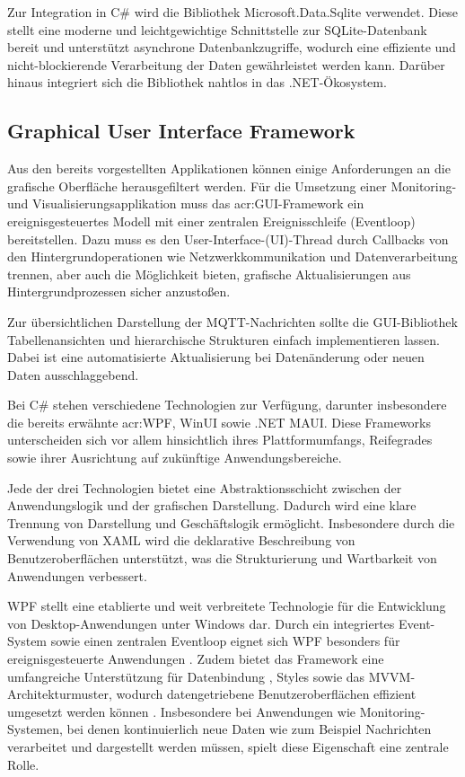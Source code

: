        Zur Integration in C\# wird die Bibliothek Microsoft.Data.Sqlite verwendet. 
        Diese stellt eine moderne und leichtgewichtige Schnittstelle zur SQLite-Datenbank 
        bereit und unterstützt asynchrone Datenbankzugriffe, wodurch eine effiziente 
        und nicht-blockierende Verarbeitung der Daten gewährleistet werden kann. Darüber hinaus integriert sich die Bibliothek nahtlos in das .NET-Ökosystem. \autocite{ajcvickersOverviewMicrosoftDataSqlite}
        
    \subsection{Graphical User Interface Framework}
        Aus den bereits vorgestellten Applikationen können einige Anforderungen an die grafische Oberfläche herausgefiltert werden. Für die Umsetzung einer Monitoring- und Visualisierungsapplikation muss das \acrshort{acr:GUI}-Framework ein ereignisgesteuertes Modell mit einer
        zentralen Ereignisschleife (Eventloop) bereitstellen. Dazu muss es den User-Interface-(UI)-Thread durch Callbacks von den Hintergrundoperationen wie Netzwerkkommunikation und Datenverarbeitung
        trennen, aber auch die Möglichkeit bieten, grafische Aktualisierungen aus Hintergrundprozessen sicher anzustoßen.

        Zur übersichtlichen Darstellung der MQTT-Nachrichten sollte die GUI-Bibliothek Tabellenansichten und hierarchische Strukturen einfach implementieren lassen. 
        Dabei ist eine automatisierte Aktualisierung bei Datenänderung oder neuen Daten ausschlaggebend.

        Bei C\# stehen verschiedene Technologien zur Verfügung, darunter insbesondere die bereits erwähnte \acrshort{acr:WPF}, WinUI sowie .NET MAUI.
        Diese Frameworks unterscheiden sich vor allem hinsichtlich ihres Plattformumfangs, Reifegrades sowie ihrer Ausrichtung auf zukünftige Anwendungsbereiche. \autocite{XAMLMitWPF}

        Jede der drei Technologien bietet eine Abstraktionsschicht zwischen der Anwendungslogik und der grafischen Darstellung. Dadurch wird eine klare Trennung 
        von Darstellung und Geschäftslogik ermöglicht. Insbesondere durch die Verwendung von XAML wird die deklarative Beschreibung von Benutzeroberflächen unterstützt,
        was die Strukturierung und Wartbarkeit von Anwendungen verbessert. \autocite{XAMLMitWPF}
        
        WPF stellt eine etablierte und weit verbreitete Technologie für die Entwicklung von Desktop-Anwendungen unter Windows dar. 
        Durch ein integriertes Event-System sowie einen zentralen Eventloop eignet sich WPF besonders für ereignisgesteuerte Anwendungen \autocite{XAMLMitWPF}.
        Zudem bietet das Framework eine umfangreiche Unterstützung für Datenbindung \autocite[7]{wegenerWPF45Und2012}, Styles sowie das MVVM-Architekturmuster, wodurch datengetriebene Benutzeroberflächen
        effizient umgesetzt werden können \autocite{XAMLMitWPF}.
        Insbesondere bei Anwendungen wie Monitoring-Systemen, bei denen kontinuierlich neue Daten wie zum Beispiel Nachrichten verarbeitet und dargestellt werden müssen,
        spielt diese Eigenschaft eine zentrale Rolle. 

